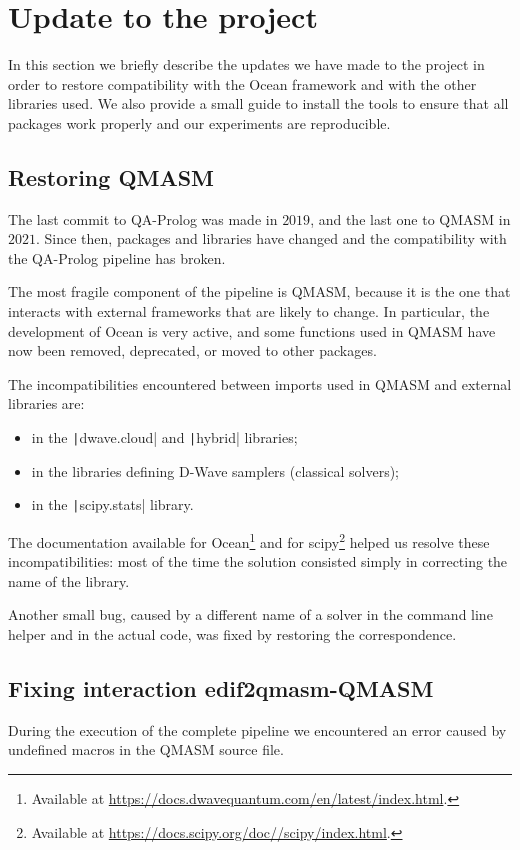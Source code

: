 {\section{Update to the project}
In this section we briefly describe the updates we have made to the project in order to restore compatibility with the Ocean framework and with the other libraries used. We also provide a small guide to install the tools to ensure that all packages work properly and our experiments are reproducible.
\subsection{Restoring QMASM}
The last commit to QA-Prolog was made in $2019$, and the last one to QMASM in $2021$. Since then, packages and libraries have changed and the compatibility with the QA-Prolog pipeline has broken.

The most fragile component of the pipeline is QMASM, because it is the one that interacts with external frameworks that are likely to change. In particular, the development of Ocean is very active, and some functions used in QMASM have now been removed, deprecated, or moved to other packages.

The incompatibilities encountered between imports used in QMASM and external libraries are:
\begin{itemize}
	\item in the \texttt|dwave.cloud| and \texttt|hybrid| libraries;
	\item in the libraries defining D-Wave samplers (classical solvers);
	\item in the \texttt|scipy.stats| library.
\end{itemize}
The documentation available for Ocean\footnote{Available at \url{https://docs.dwavequantum.com/en/latest/index.html}.} and for scipy\footnote{Available at \url{https://docs.scipy.org/doc//scipy/index.html}.} helped us resolve these incompatibilities: most of the time the solution consisted simply in correcting the name of the library.

Another small bug, caused by a different name of a solver in the command line helper and in the actual code, was fixed by restoring the correspondence.

\subsection{Fixing interaction edif2qmasm-QMASM}
During the execution of the complete pipeline we encountered an error caused by undefined macros in the QMASM source file.

}
